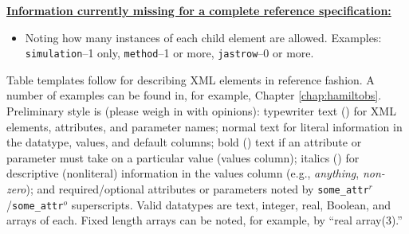 \textbf{\underline{Information currently missing for a complete reference specification:}}
\begin{itemize}
  \item{Noting how many instances of each child element are allowed.  Examples: \texttt{simulation}--1 only, \texttt{method}--1 or more, \texttt{jastrow}--0 or more}.
\end{itemize}


Table templates follow for describing XML elements in reference fashion.  A number of examples can be found in, for example, Chapter \ref{chap:hamiltobs}.  Preliminary style is (please weigh in with opinions): typewriter text (\ilatex{\\texttt\{\}}) for XML elements, attributes, and parameter names; normal text for literal information in the datatype, values, and default columns; bold (\ilatex{\\textbf\{\}}) text if an attribute or parameter must take on a particular value (values column); italics (\ilatex{\\textit\{\}}) for descriptive (nonliteral) information in the values column (e.g., \textit{anything}, \textit{non-zero}); and required/optional attributes or parameters noted by \texttt{some\_attr$^r$}/\texttt{some\_attr$^o$} superscripts.  Valid datatypes are text, integer, real, Boolean, and arrays of each.  Fixed length arrays can be noted, for example, by ``real array(3).''


